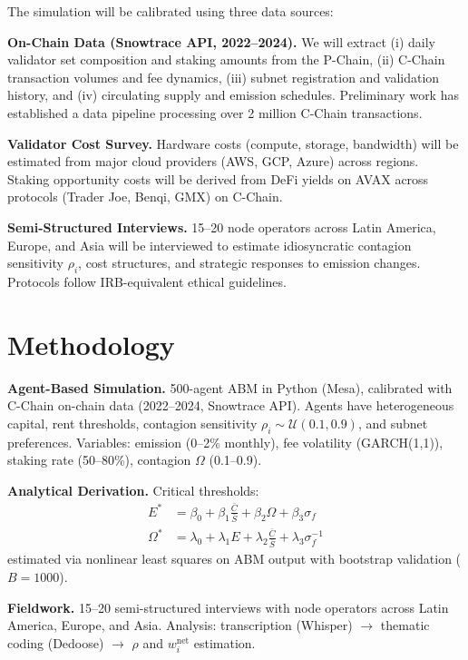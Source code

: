 \documentclass[11pt,a4paper]{article}
\begin{document}
The simulation will be calibrated using three data sources:

\noindent\textbf{On-Chain Data (Snowtrace API, 2022--2024).} We will extract (i) daily validator set composition and staking amounts from the P-Chain, (ii) C-Chain transaction volumes and fee dynamics, (iii) subnet registration and validation history, and (iv) circulating supply and emission schedules. Preliminary work has established a data pipeline processing over 2 million C-Chain transactions.

\noindent\textbf{Validator Cost Survey.} Hardware costs (compute, storage, bandwidth) will be estimated from major cloud providers (AWS, GCP, Azure) across regions. Staking opportunity costs will be derived from DeFi yields on AVAX across protocols (Trader Joe, Benqi, GMX) on C-Chain.

\noindent\textbf{Semi-Structured Interviews.} 15--20 node operators across Latin America, Europe, and Asia will be interviewed to estimate idiosyncratic contagion sensitivity $\rho_i$, cost structures, and strategic responses to emission changes. Protocols follow IRB-equivalent ethical guidelines.

\section{Methodology}

\textbf{Agent-Based Simulation.} 500-agent ABM in Python (Mesa), calibrated with C-Chain on-chain data (2022--2024, Snowtrace API). Agents have heterogeneous capital, rent thresholds, contagion sensitivity $\rho_i \sim \mathcal{U}(0.1, 0.9)$, and subnet preferences. Variables: emission (0--2\% monthly), fee volatility (GARCH(1,1)), staking rate (50--80\%), contagion $\Omega$ (0.1--0.9).

\textbf{Analytical Derivation.} Critical thresholds:
\begin{align}
E^* &= \beta_0 + \beta_1\frac{\bar{C}}{\bar{S}} + \beta_2\Omega + \beta_3\sigma_f \\
\Omega^* &= \lambda_0 + \lambda_1 E + \lambda_2\frac{\bar{C}}{\bar{S}} + \lambda_3\sigma_f^{-1}
\end{align}
estimated via nonlinear least squares on ABM output with bootstrap validation ($B = 1000$).

\textbf{Fieldwork.} 15--20 semi-structured interviews with node operators across Latin America, Europe, and Asia. Analysis: transcription (Whisper) $\rightarrow$ thematic coding (Dedoose) $\rightarrow$ $\rho$ and $w_i^{\text{net}}$ estimation.
\end{document}
